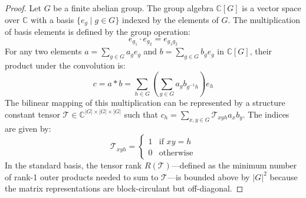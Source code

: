 \documentclass[11pt,a4paper]{book}
\begin{document}
\begin{proof}
Let $G$ be a finite abelian group. The group algebra $\mathbb{C}[G]$ is a vector space over $\mathbb{C}$ with a basis $\{e_g \mid g \in G\}$ indexed by the elements of $G$. The multiplication of basis elements is defined by the group operation:
\begin{equation}
\label{eq:basis_mult}
e_{g_1} \cdot e_{g_2} = e_{g_1 g_2}
\end{equation}
For any two elements $a = \sum_{g \in G} a_g e_g$ and $b = \sum_{g \in G} b_g e_g$ in $\mathbb{C}[G]$, their product under the convolution is:
\begin{equation}
\label{eq:product_conv}
c = a * b = \sum_{h \in G} \left( \sum_{g \in G} a_g b_{g^{-1} h} \right) e_h
\end{equation}
The bilinear mapping of this multiplication can be represented by a structure constant tensor $\mathcal{T} \in \mathbb{C}^{\lvert G \rvert \times \lvert G \rvert \times \lvert G \rvert}$ such that $c_h = \sum_{x, y \in G} \mathcal{T}_{xyh} a_x b_y$. The indices are given by:
\begin{equation}
\label{eq:structure_constants}
\mathcal{T}_{xyh} = \begin{cases} 1 & \text{if } xy = h \\ 0 & \text{otherwise} \end{cases}
\end{equation}
In the standard basis, the tensor rank $R(\mathcal{T})$---defined as the minimum number of rank-1 outer products needed to sum to $\mathcal{T}$---is bounded above by $\lvert G \rvert^2$ because the matrix representations are block-circulant but off-diagonal.


\end{proof}
\end{document}
